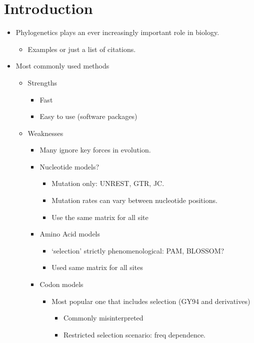 \documentclass[12pt]{article}
\begin{document}
\section*{Introduction}
\begin{itemize}
\item Phylogenetics plays an ever increasingly important role in biology.
  \begin{itemize}
  \item Examples or just a list of citations.
  \end{itemize}
\item Most commonly used methods
  \begin{itemize}
  \item Strengths
    \begin{itemize}
    \item Fast
    \item Easy to use (software packages)
    \end{itemize}
  \item Weaknesses
    \begin{itemize}
    \item Many ignore key forces in evolution.
    \item Nucleotide models?
      \begin{itemize}
      \item Mutation only: UNREST, GTR, JC.
      \item Mutation rates can vary between nucleotide positions.
      \item Use the same matrix for all site
      \end{itemize}
    \item Amino Acid models
      \begin{itemize}
      \item `selection' strictly phenomenological: PAM, BLOSSOM?        
      \item Used same matrix for all sites
      \end{itemize}
    \item Codon models
      \begin{itemize}
      \item Most popular one that includes selection (GY94 and derivatives)
        \begin{itemize}
        \item Commonly misinterpreted
        \item Restricted selection scenario: freq dependence.
        \end{itemize}

\end{itemize}
\end{itemize}
\end{itemize}
\end{itemize}
\end{document}
